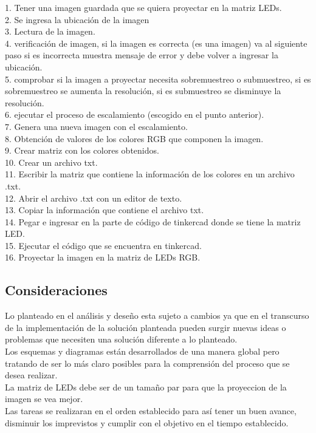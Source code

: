 \documentclass{article}
\begin{document}
1.	Tener una imagen guardada que se quiera proyectar en la matriz LEDs.\\
2.	Se ingresa la ubicación de la imagen\\
3.	Lectura de la imagen.\\
4.	verificación de imagen, si la imagen es correcta (es una imagen) va al siguiente paso si es incorrecta muestra mensaje de error y debe volver a ingresar la ubicación.\\
5.	comprobar si la imagen a proyectar necesita sobremuestreo o submuestreo, si es sobremuestreo se aumenta la resolución, si es submuestreo se disminuye la resolución.\\
6.	ejecutar el proceso de escalamiento (escogido en el punto anterior).\\
7.	Genera una nueva imagen con el escalamiento.\\
8.	Obtención de valores de los colores RGB que componen la imagen.\\
9.	Crear matriz con los colores obtenidos.\\
10.	Crear un archivo txt.\\
11.	Escribir la matriz que contiene la información de los colores en un archivo .txt.\\
12.	Abrir el archivo .txt con un editor de texto.\\
13.	Copiar la información que contiene el archivo txt.\\
14.	Pegar e ingresar en la parte de código de tinkercad donde se tiene la matriz LED.\\
15.	Ejecutar el código que se encuentra en tinkercad.\\
16.	Proyectar la imagen en la matriz de LEDs RGB.\\

\subsection{Consideraciones}

Lo planteado en el análisis y deseño esta sujeto a cambios ya que en el transcurso de la implementación de la solución planteada pueden surgir nuevas ideas o problemas que necesiten una solución diferente a lo planteado.\\
Los esquemas y diagramas están desarrollados de una manera global pero tratando de ser lo más claro posibles para la comprensión del proceso que se desea realizar.\\
La matriz de LEDs debe ser de un tamaño par para que la proyeccion de la imagen se vea mejor.\\
Las tareas se realizaran en el orden establecido para así tener un buen  avance, disminuir los imprevistos y cumplir con el objetivo en el tiempo establecido.
\end{document}
